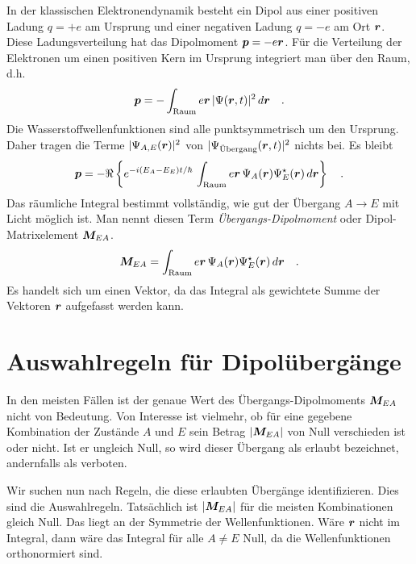 In der klassischen Elektronendynamik besteht ein Dipol aus einer positiven Ladung $q=+e$ am Ursprung und einer negativen Ladung $q=-e$ am Ort $\boldsymbol{r}$. Diese Ladungsverteilung hat das Dipolmoment $\boldsymbol{p} = -e \boldsymbol{r}$. Für die Verteilung der Elektronen um einen positiven Kern im Ursprung integriert man über den Raum, d.h. 
\begin{equation}
    \boldsymbol{p} = - \int_\text{Raum} e\boldsymbol{r} \,  | \Psi(\boldsymbol{r}, t) |^2 \, d \boldsymbol{r}   \quad .
\end{equation}
Die Wasserstoffwellenfunktionen sind alle punktsymmetrisch um den Ursprung. Daher tragen die Terme $ | \Psi_{A,E}(\boldsymbol{r})|^2$ von $| \Psi_\text{Übergang}(\boldsymbol{r},t)|^2$ nichts bei. Es bleibt 
\begin{equation}
    \boldsymbol{p} =  - \Re \left \{ e^{-i (E_A - E_E) t / \hbar}  \, \int_\text{Raum} e\boldsymbol{r} \,  \Psi_A(\boldsymbol{r})\Psi_E^\star(\boldsymbol{r})  \, d \boldsymbol{r} \right \} \quad .
\end{equation}
Das räumliche Integral bestimmt vollständig, wie gut der Übergang $A \rightarrow E$ mit Licht möglich ist. Man nennt diesen Term \emph{Übergangs-Dipolmoment} oder Dipol-Matrixelement $\boldsymbol{M}_{EA}$.
\begin{equation}
    \boldsymbol{M}_{EA} = \int_\text{Raum} e\boldsymbol{r} \,  \Psi_A(\boldsymbol{r})\Psi_E^\star(\boldsymbol{r})  \, d \boldsymbol{r}  \quad .
    \label{eq:7_Matrix_element}
\end{equation}
Es handelt sich um einen Vektor, da das Integral als gewichtete Summe der Vektoren $\boldsymbol{r}$ aufgefasst werden kann.




\section{Auswahlregeln für Dipolübergänge}

In den meisten Fällen ist der genaue Wert des Übergangs-Dipolmoments $\boldsymbol{M}_{EA}$ nicht von Bedeutung. Von Interesse ist vielmehr, ob für eine gegebene Kombination der Zustände $A$ und $E$ sein Betrag $|\boldsymbol{M}_{EA}|$ von Null verschieden ist oder nicht. Ist er ungleich Null, so wird dieser Übergang als erlaubt bezeichnet, andernfalls als verboten. 

Wir suchen nun nach Regeln, die diese erlaubten Übergänge identifizieren. Dies sind die Auswahlregeln. Tatsächlich ist $|\boldsymbol{M}_{EA}|$ für die meisten Kombinationen gleich Null. Das liegt an der Symmetrie der Wellenfunktionen. Wäre $\boldsymbol{r}$ nicht im Integral, dann wäre das Integral für alle $A \neq E$ Null, da die Wellenfunktionen orthonormiert sind.

